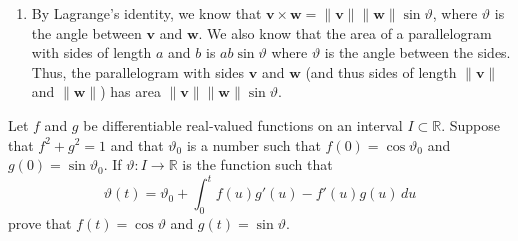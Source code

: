 \documentclass[12 pt, letterpaper]{hmcpset}
\begin{document}
\begin{solution}
\begin{enumerate}
			Suppose, without loss of generality that $v_{\sigma_j} \neq 0$. Then we have
			\[
				w_{\sigma^2(j)} = \frac{w_{\sigma(j)}}{v_{\sigma(j)}} v_{\sigma^2(j)}.
			\]
			Similarly, we have that the $\sigma^2(j)$th component (note that $\sigma^2 = \sigma^{-1}$) is
			\[
				v_j w_{\sigma_j} - v_{\sigma(j)} w_j = 0.
			\]
			Again, with our assumption that $v_{\sigma_j} \neq 0$, we have
			\[
				w_j = \frac{w_{\sigma(j)}}{v_{\sigma(j)}} v_j.
			\]
			Finally, we obviously have
			\[
				w_{\sigma(j)} = \frac{w_{\sigma(j)}}{v_{\sigma(j)}} v_{\sigma_j}.
			\]
			Thus, we have $\mathbf{w} = \lambda \mathbf{v}$ where $\lambda = \frac{w_{\sigma_j}}{v_{\sigma(j)}}$, making $\mathbf{v}$ and $\mathbf{w}$ linearly dependent.
		\item
			By Lagrange's identity, we know that $\mathbf{v} \times \mathbf{w} = \lVert \mathbf{v} \rVert \lVert \mathbf{w} \rVert \sin \vartheta$, where $\vartheta$ is the angle between $\mathbf{v}$ and $\mathbf{w}$. We also know that the area of a parallelogram with sides of length $a$ and $b$ is $ab \sin \vartheta$ where $\vartheta$ is the angle between the sides. Thus, the parallelogram with sides $\mathbf{v}$ and $\mathbf{w}$ (and thus sides of length $\lVert \mathbf{v} \rVert$ and $\lVert \mathbf{w} \rVert$) has area $\lVert \mathbf{v} \rVert \lVert \mathbf{w} \rVert \sin \vartheta$.
	\end{enumerate}
\end{solution}

\pagebreak

\begin{problem}[Problem 4.]
	Let $f$ and $g$ be differentiable real-valued functions on an interval $I \subset \mathbb{R}$. Suppose that $f^2 + g^2 = 1$ and that $\vartheta_0$ is a number such that $f(0) = \cos \vartheta_0$ and $g(0) = \sin \vartheta_0$. If $\vartheta : I \to \mathbb{R}$ is the function such that
	\[
		\vartheta(t) = \vartheta_0 + \int_0^t f(u) g'(u) - f'(u) g(u) \, du
	\] 
	prove that $f(t) = \cos \vartheta$ and $g(t) = \sin \vartheta$.
\end{problem}
\end{document}
